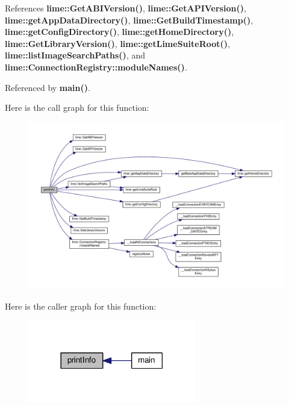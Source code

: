 References {\bf lime\+::\+Get\+A\+B\+I\+Version()}, {\bf lime\+::\+Get\+A\+P\+I\+Version()}, {\bf lime\+::get\+App\+Data\+Directory()}, {\bf lime\+::\+Get\+Build\+Timestamp()}, {\bf lime\+::get\+Config\+Directory()}, {\bf lime\+::get\+Home\+Directory()}, {\bf lime\+::\+Get\+Library\+Version()}, {\bf lime\+::get\+Lime\+Suite\+Root()}, {\bf lime\+::list\+Image\+Search\+Paths()}, and {\bf lime\+::\+Connection\+Registry\+::module\+Names()}.



Referenced by {\bf main()}.



Here is the call graph for this function\+:
\nopagebreak
\begin{figure}[H]
\begin{center}
\leavevmode
\includegraphics[width=350pt]{d5/db6/LimeUtil_8cpp_a66eb714e8ab3741938794494ccb095fc_cgraph}
\end{center}
\end{figure}




Here is the caller graph for this function\+:
\nopagebreak
\begin{figure}[H]
\begin{center}
\leavevmode
\includegraphics[width=206pt]{d5/db6/LimeUtil_8cpp_a66eb714e8ab3741938794494ccb095fc_icgraph}
\end{center}
\end{figure}


